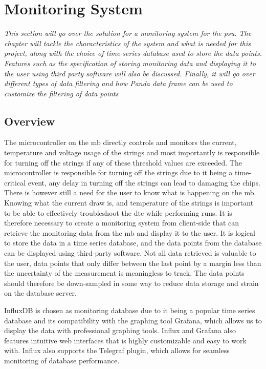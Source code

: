\documentclass[main.tex]{subfiles}
\begin{document}
\section{Monitoring System}
\label{section: monitoring}
\textit{This section will go over the solution for a monitoring system for the \gls{psu}. The chapter will tackle the characteristics of the system and what is needed for this project, along with the choice of time-series database used to store the data points. Features such as the specification of storing monitoring data and displaying it to the user using third party software will also be discussed. Finally, it will go over different types of data filtering and how Panda data frame can be used to customize the filtering of data points }

\subsection{Overview}

 The microcontroller on the \gls{mb} directly controls and monitors the current, temperature and voltage usage of the strings and most importantly is responsible for turning off the strings if any of these threshold values are exceeded. The microcontroller is responsible for turning off the strings due to it being a time-critical event, any delay in turning off the strings can lead to damaging the chips. There is however still a need for the user to know what is happening on the \gls{mb}. Knowing what the current draw is, and temperature of the strings is important to be able to effectively troubleshoot the \gls{dtc} while performing runs. It is therefore necessary to create a monitoring system from client-side that can retrieve the monitoring data from the \gls{mb} and display it to the user. It is logical to store the data in a time series database, and the data points from the database can be displayed using third-party software. Not all data retrieved is valuable to the user, data points that only differ between the last point by a margin less than the uncertainty of the measurement is meaningless to track. The data points should therefore be down-sampled in some way to reduce data storage and strain on the database server.

 InfluxDB is chosen as monitoring database due to it being a popular time series database and its compatibility with the graphing tool Grafana, which allows us to display the data with professional graphing tools. Influx and Grafana also features intuitive web interfaces that is highly customizable and easy to work with. Influx also supports the Telegraf plugin, which allows for seamless monitoring of database performance. 
 
\end{document}
